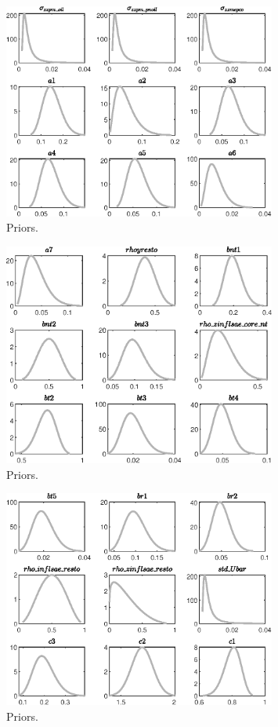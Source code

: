 \begin{figure}[H]
\centering
\includegraphics[width=0.80\textwidth]{calculate_estimate/graphs/calculate_estimate_Priors4}
\caption{Priors.}\label{Fig:Priors:4}
\end{figure}
\begin{figure}[H]
\centering
\includegraphics[width=0.80\textwidth]{calculate_estimate/graphs/calculate_estimate_Priors5}
\caption{Priors.}\label{Fig:Priors:5}
\end{figure}
\begin{figure}[H]
\centering
\includegraphics[width=0.80\textwidth]{calculate_estimate/graphs/calculate_estimate_Priors6}
\caption{Priors.}\label{Fig:Priors:6}
\end{figure}
